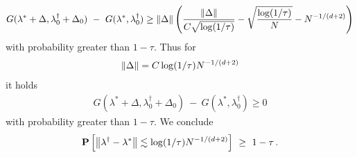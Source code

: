 \begin{align}
      G
     (
     \lambda^*
      +
      \Delta
      ,
      \lambda^\dagger_0
      +
     \Delta_0
     )
     \ 
     -
     \ 
     G
     (
     \lambda^*,
      \lambda^\dagger_0
     )
     \ge
     \norm{\Delta}
     \left(
     \frac{\norm{\Delta}}
     {
       C \sqrt{\log(1/\tau)}
     }
     -
       \sqrt{
       \frac{\log(1/\tau)}{N}
       }
       -
       N^{-1/(d+2)}
     \right)
\end{align}
with probability greater than $1-\tau$.
Thus for
\begin{gather}
  \left\lVert\Delta\right\rVert
  =
  C
  \log(1/\tau)
  N^{-1/(d+2)}
\end{gather}
it holds
\begin{gather}
       G
     (
     \lambda^*
      +
      \Delta
      ,
      \lambda^\dagger_0
      +
     \Delta_0
     )
     \ 
     -
     \ 
     G
     (
     \lambda^*,
      \lambda^\dagger_0
     )
     \ge
0
\end{gather}
with probability greater than $1-\tau$.
We conclude
  \begin{gather}
    \P
    \left[ 
      \norm{\lambda^\dagger - \lambda^*}
    \lesssim
  \log(1/\tau)
  N^{-1/(d+2)}
    \right]
    \ 
    \ge
    \ 
    1-\tau
    \,.
  \end{gather}
